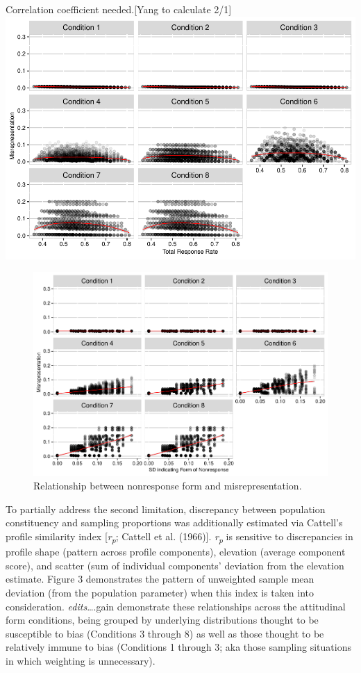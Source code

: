 \documentclass[
  man,mask]{apa7}
\begin{document}
Correlation coefficient needed.{[}Yang to calculate 2/1{]}
\includegraphics{Simulation-paper2-20200207_files/figure-latex/Figure1-1.pdf}

\begin{figure}
\centering
\includegraphics{Simulation-paper2-20200207_files/figure-latex/Figure2-1.pdf}
\caption{\label{fig:Figure2}Relationship between nonresponse form and misrepresentation.}
\end{figure}

To partially address the second limitation, discrepancy between population constituency and sampling proportions was additionally estimated via Cattell's profile similarity index {[}\emph{r\textsubscript{p}}; Cattell et al. (1966){]}. \emph{r\textsubscript{p}} is sensitive to discrepancies in profile shape (pattern across profile components), elevation (average component score), and scatter (sum of individual components' deviation from the elevation estimate. Figure 3 demonstrates the pattern of unweighted sample mean deviation (from the population parameter) when this index is taken into consideration. \emph{edits}\ldots.gain demonstrate these relationships across the attitudinal form conditions, being grouped by underlying distributions thought to be susceptible to bias (Conditions 3 through 8) as well as those thought to be relatively immune to bias (Conditions 1 through 3; aka those sampling situations in which weighting is unnecessary).
\end{document}
